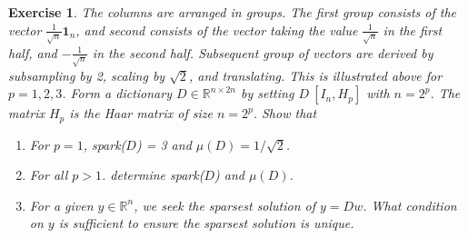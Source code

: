 \documentclass[12pt]{article}
\theoremstyle{colon}
\newtheorem{exercise}{Exercise}
\begin{document}
\begin{exercise}
  The columns are arranged in groups. The first group consists of the vector $\frac{1}{\sqrt{n}} \bm{1}_n$, and second consists of the vector taking the value $\frac{1}{\sqrt{n}}$ in the first half, and $-\frac{1}{\sqrt{n}}$ in the second half. Subsequent group of vectors are derived by subsampling by 2, scaling by $\sqrt{2}$, and translating. This is illustrated above for $p = 1, 2, 3$. Form a dictionary $D \in \mathbb{R}^{n \times 2n}$ by setting $D \ [I_n, H_p]$ with $n = 2^p$. The matrix $H_p$ is the Haar matrix of size $n = 2^p$. Show that
  \begin{enumerate}[label=\alph*)]
    \item For $p = 1$, spark($D$) = 3 and $\mu(D) = 1/\sqrt{2}$.
    \item For all $p > 1$. determine spark($D$) and $\mu(D)$.
    \item For a given $y \in \mathbb{R}^n$, we seek the sparsest solution of $y = Dw$. What condition on $y$ is sufficient to ensure the sparsest solution is unique.
  \end{enumerate}
\end{exercise}
\end{document}
